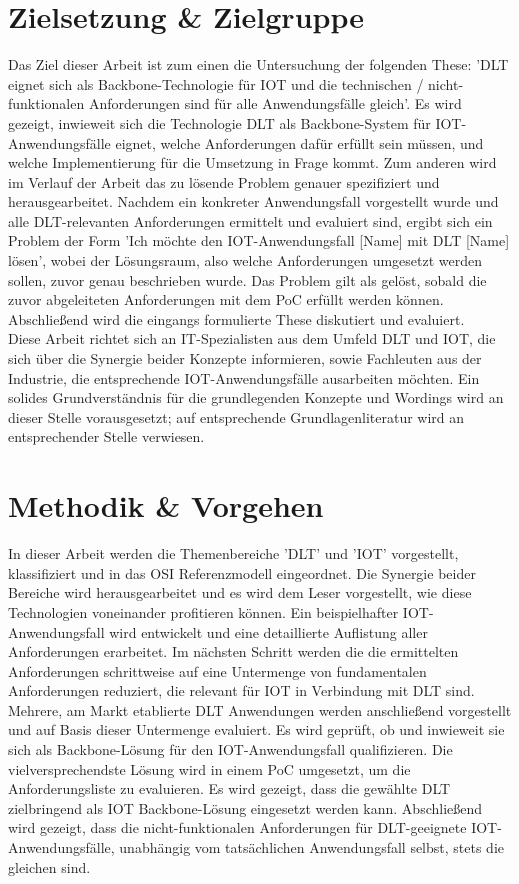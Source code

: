 %
%
\section{Zielsetzung \& Zielgruppe}
\label{sec:intro:goal}
Das Ziel dieser Arbeit ist zum einen die Untersuchung der folgenden These: 'DLT eignet sich als Backbone-Technologie für IOT und die technischen / nicht-funktionalen Anforderungen sind für alle Anwendungsfälle gleich'. Es wird gezeigt, inwieweit sich die Technologie \ac{DLT} als Backbone-System für \ac{IOT}-Anwendungsfälle eignet, welche Anforderungen dafür erfüllt sein müssen, und welche Implementierung für die Umsetzung in Frage kommt. Zum anderen wird im Verlauf der Arbeit das zu lösende Problem genauer spezifiziert und herausgearbeitet. Nachdem ein konkreter Anwendungsfall vorgestellt wurde und alle \ac{DLT}-relevanten Anforderungen ermittelt und evaluiert sind, ergibt sich ein Problem der Form 'Ich möchte den IOT-Anwendungsfall [Name] mit DLT [Name] lösen', wobei der Lösungsraum, also welche Anforderungen umgesetzt werden sollen, zuvor genau beschrieben wurde. Das Problem gilt als gelöst, sobald die zuvor abgeleiteten Anforderungen mit dem PoC erfüllt werden können. Abschließend wird die eingangs formulierte These diskutiert und evaluiert.\\
Diese Arbeit richtet sich an IT-Spezialisten aus dem Umfeld \ac{DLT} und \ac{IOT}, die sich über die Synergie beider Konzepte informieren, sowie Fachleuten aus der Industrie, die entsprechende \ac{IOT}-Anwendungsfälle ausarbeiten möchten. Ein solides Grundverständnis für die grundlegenden Konzepte und Wordings wird an dieser Stelle vorausgesetzt; auf entsprechende Grundlagenliteratur wird an entsprechender Stelle verwiesen.

%
%
\section{Methodik \& Vorgehen}
\label{sec:intro:methodology}
In dieser Arbeit werden die Themenbereiche '\ac{DLT}' und '\ac{IOT}' vorgestellt, klassifiziert und in das \ac{OSI} Referenzmodell eingeordnet. Die Synergie beider Bereiche wird herausgearbeitet und es wird dem Leser vorgestellt, wie diese Technologien voneinander profitieren können. Ein beispielhafter \ac{IOT}-Anwendungsfall wird entwickelt und eine detaillierte Auflistung aller Anforderungen erarbeitet. Im nächsten Schritt werden die die ermittelten Anforderungen schrittweise auf eine Untermenge von fundamentalen Anforderungen reduziert, die relevant für \ac{IOT} in Verbindung mit DLT sind. Mehrere, am Markt etablierte DLT Anwendungen werden anschließend vorgestellt und auf Basis dieser Untermenge evaluiert. Es wird geprüft, ob und inwieweit sie sich als Backbone-Lösung für den \ac{IOT}-Anwendungsfall qualifizieren. Die vielversprechendste Lösung wird in einem PoC umgesetzt, um die Anforderungsliste zu evaluieren. Es wird gezeigt, dass die gewählte \ac{DLT} zielbringend als \ac{IOT} Backbone-Lösung eingesetzt werden kann. Abschließend wird gezeigt, dass die nicht-funktionalen Anforderungen für \ac{DLT}-geeignete IOT-Anwendungsfälle, unabhängig vom tatsächlichen Anwendungsfall selbst, stets die gleichen sind.

